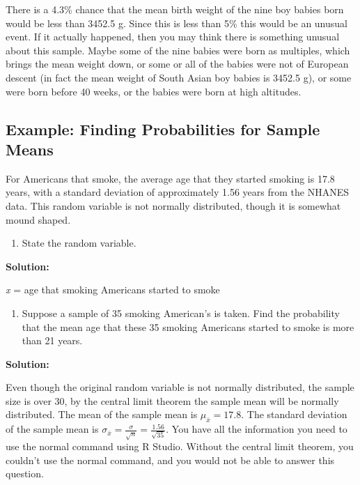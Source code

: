 \documentclass[
]{book}
\providecommand{\tightlist}{%
  \setlength{\itemsep}{0pt}\setlength{\parskip}{0pt}}
\begin{document}
There is a 4.3\% chance that the mean birth weight of the nine boy babies born would be less than 3452.5 g. Since this is less than 5\% this would be an unusual event. If it actually happened, then you may think there is something unusual about this sample. Maybe some of the nine babies were born as multiples, which brings the mean weight down, or some or all of the babies were not of European descent (in fact the mean weight of South Asian boy babies is 3452.5 g), or some were born before 40 weeks, or the babies were born at high altitudes.

\hypertarget{example-finding-probabilities-for-sample-means-1}{%
\subsection{Example: Finding Probabilities for Sample Means}\label{example-finding-probabilities-for-sample-means-1}}

For Americans that smoke, the average age that they started smoking is 17.8 years, with a standard deviation of approximately 1.56 years from the NHANES data. This random variable is not normally distributed, though it is somewhat mound shaped.

\begin{enumerate}
\def\labelenumi{\alph{enumi}.}
\tightlist
\item
  State the random variable.
\end{enumerate}

\textbf{Solution:}

\emph{x} = age that smoking Americans started to smoke

\begin{enumerate}
\def\labelenumi{\alph{enumi}.}
\setcounter{enumi}{1}
\tightlist
\item
  Suppose a sample of 35 smoking American's is taken. Find the probability that the mean age that these 35 smoking Americans started to smoke is more than 21 years.
\end{enumerate}

\textbf{Solution:}

Even though the original random variable is not normally distributed, the sample size is over 30, by the central limit theorem the sample mean will be normally distributed. The mean of the sample mean is \(\mu_{\bar{x}}=17.8\). The standard deviation of the sample mean is \(\sigma_{\bar{x}}=\frac{\sigma}{\sqrt{n}}=\frac{1.56}{\sqrt{35}}\). You have all the information you need to use the normal command using R Studio. Without the central limit theorem, you couldn't use the normal command, and you would not be able to answer this question.
\end{document}
